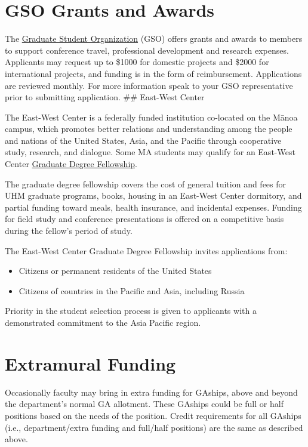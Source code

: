 \documentclass[
]{book}
\providecommand{\tightlist}{%
  \setlength{\itemsep}{0pt}\setlength{\parskip}{0pt}}
\begin{document}
\section{GSO Grants and Awards}\label{gso-grants-and-awards}

The \href{https://uhmgso.wixsite.com/website-1/grants-and-awards}{Graduate Student Organization} (GSO) offers grants and awards to members to support conference travel, professional development and research expenses. Applicants may request up to \$1000 for domestic projects and \$2000 for international projects, and funding is in the form of reimbursement. Applications are reviewed monthly. For more information speak to your GSO representative prior to submitting application.
\#\# East-West Center

The East-West Center is a federally funded institution co-located on the Mānoa campus, which promotes better relations and understanding among the people and nations of the United States, Asia, and the Pacific through cooperative study, research, and dialogue. Some MA students may qualify for an East-West Center \href{https://www.eastwestcenter.org/education/ewc-graduate-degree-fellowship}{Graduate Degree Fellowship}.

The graduate degree fellowship covers the cost of general tuition and fees for UHM graduate programs, books, housing in an East-West Center dormitory, and partial funding toward meals, health insurance, and incidental expenses. Funding for field study and conference presentations is offered on a competitive basis during the fellow's period of study.

The East-West Center Graduate Degree Fellowship invites applications from:

\begin{itemize}
\tightlist
\item
  Citizens or permanent residents of the United States
\item
  Citizens of countries in the Pacific and Asia, including Russia
\end{itemize}

Priority in the student selection process is given to applicants with a demonstrated commitment to the Asia Pacific region.

\section{Extramural Funding}\label{extramural-funding}

Occasionally faculty may bring in extra funding for GAships, above and beyond the department's normal GA allotment. These GAships could be full or half positions based on the needs of the position. Credit requirements for all GAships (i.e., department/extra funding and full/half positions) are the same as described above.
\end{document}

